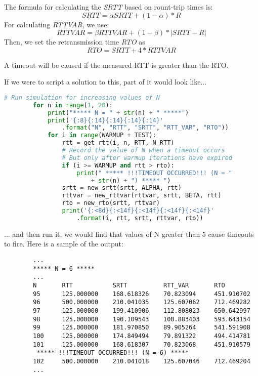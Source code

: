 \documentclass[10pt]{amsart}
\begin{document}
\begin{enumerate}
        The formula for calculating the \textit{SRTT} based on rount-trip times is:
        \[ SRTT = \alpha SRTT + (1-\alpha) * R \]
        For calculating \textit{RTTVAR}, we use:
        \[ RTTVAR = \beta RTTVAR + (1-\beta) * |SRTT - R| \]
        Then, we set the retransmission time \textit{RTO} as 
        \[ RTO = SRTT + 4*RTTVAR \]

        A timeout will be caused if the measured RTT is greater than the RTO.

        If we were to script a solution to this, part of it would look like...

        \begin{lstlisting}[language=python]
        # Run simulation for increasing values of N
        for n in range(1, 20):
            print("***** N = " + str(n) + " *****")
            print('{:8}{:14}{:14}{:14}{:14}'
                .format("N", "RTT", "SRTT", "RTT_VAR", "RTO"))
            for i in range(WARMUP + TEST):
                rtt = get_rtt(i, n, RTT, N_RTT)
                # Record the value of N when a timeout occurs
                # But only after warmup iterations have expired
                if (i >= WARMUP and rtt > rto):
                    print(" ***** !!!TIMEOUT OCCURRED!!! (N = " 
                        + str(n) + ") ***** ")
                srtt = new_srtt(srtt, ALPHA, rtt)
                rttvar = new_rttvar(rttvar, srtt, BETA, rtt)
                rto = new_rto(srtt, rttvar)
                print('{:<8d}{:<14f}{:<14f}{:<14f}{:<14f}'
                    .format(i, rtt, srtt, rttvar, rto))
        \end{lstlisting}

        ... and then run it, we would find that values of N greater than 5 cause
        timeouts to fire.  Here is a sample of the output:

        \begin{verbatim}
        ...
        ***** N = 6 *****
        ...
        N       RTT           SRTT          RTT_VAR       RTO       
        95      125.000000    168.618326    70.823094     451.910702
        96      500.000000    210.041035    125.607062    712.469282
        97      125.000000    199.410906    112.808023    650.642997
        98      125.000000    190.109543    100.883403    593.643154
        99      125.000000    181.970850    89.905264     541.591908
        100     125.000000    174.849494    79.891322     494.414781
        101     125.000000    168.618307    70.823068     451.910579
         ***** !!!TIMEOUT OCCURRED!!! (N = 6) *****
        102     500.000000    210.041018    125.607046    712.469204
        ...
        \end{verbatim}


\end{enumerate}
\end{document}
